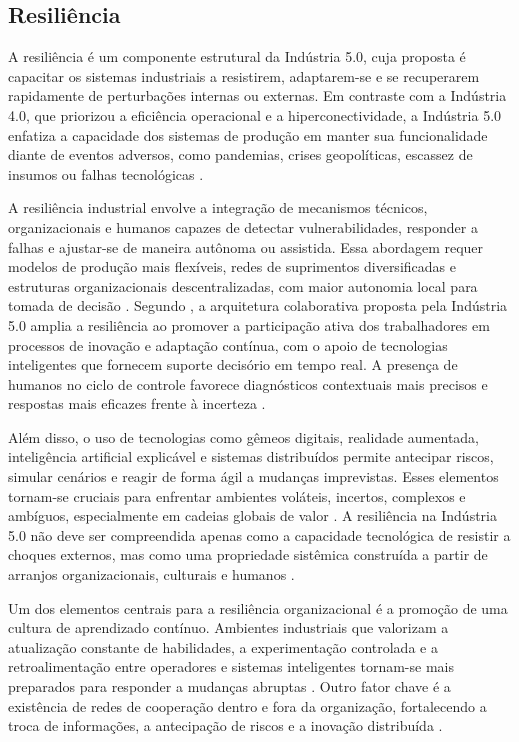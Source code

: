 \subsection{Resiliência}

A resiliência é um componente estrutural da Indústria 5.0, cuja proposta é capacitar os sistemas industriais a resistirem, adaptarem-se e se recuperarem rapidamente de perturbações internas ou externas. Em contraste com a Indústria 4.0, que priorizou a eficiência operacional e a hiperconectividade, a Indústria 5.0 enfatiza a capacidade dos sistemas de produção em manter sua funcionalidade diante de eventos adversos, como pandemias, crises geopolíticas, escassez de insumos ou falhas tecnológicas \cite{euCommission2021, VALETTE2023, Khan2023}.

A resiliência industrial envolve a integração de mecanismos técnicos, organizacionais e humanos capazes de detectar vulnerabilidades, responder a falhas e ajustar-se de maneira autônoma ou assistida. Essa abordagem requer modelos de produção mais flexíveis, redes de suprimentos diversificadas e estruturas organizacionais descentralizadas, com maior autonomia local para tomada de decisão \cite{Santos2025, silva2024}. Segundo , a arquitetura colaborativa proposta pela Indústria 5.0 amplia a resiliência ao promover a participação ativa dos trabalhadores em processos de inovação e adaptação contínua, com o apoio de tecnologias inteligentes que fornecem suporte decisório em tempo real. A presença de humanos no ciclo de controle favorece diagnósticos contextuais mais precisos e respostas mais eficazes frente à incerteza \cite{TOTH2023}.

Além disso, o uso de tecnologias como gêmeos digitais, realidade aumentada, inteligência artificial explicável e sistemas distribuídos permite antecipar riscos, simular cenários e reagir de forma ágil a mudanças imprevistas. Esses elementos tornam-se cruciais para enfrentar ambientes voláteis, incertos, complexos e ambíguos, especialmente em cadeias globais de valor \cite{VALETTE2023}. A resiliência na Indústria 5.0 não deve ser compreendida apenas como a capacidade tecnológica de resistir a choques externos, mas como uma propriedade sistêmica construída a partir de arranjos organizacionais, culturais e humanos \cite{TOTH2023, Santos2025}.

Um dos elementos centrais para a resiliência organizacional é a promoção de uma cultura de aprendizado contínuo. Ambientes industriais que valorizam a atualização constante de habilidades, a experimentação controlada e a retroalimentação entre operadores e sistemas inteligentes tornam-se mais preparados para responder a mudanças abruptas \cite{TOTH2023}. Outro fator chave é a existência de redes de cooperação dentro e fora da organização, fortalecendo a troca de informações, a antecipação de riscos e a inovação distribuída \cite{VALETTE2023, Santana_2023}.

